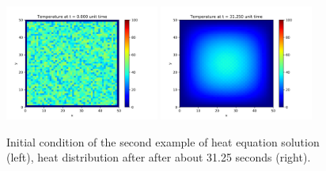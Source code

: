 \begin{figure}[htb]
	\centering
	\includegraphics[width=0.45\textwidth]{figures/frame0_2}
	\includegraphics[width=0.45\textwidth]{figures/frame250_2}
	\caption{Initial condition of the second example of heat equation solution (left), heat distribution after after about 31.25 seconds (right).}
	\label{fig:heat_2}
\end{figure} 

